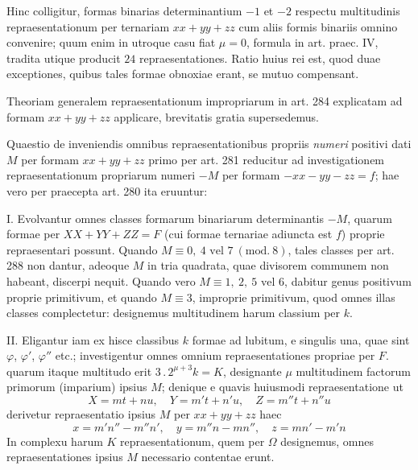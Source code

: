 Hinc colligitur, formas binarias determinantium $-1$ et $-2$ respectu multitudinis repraesentationum per ternariam $xx+yy+zz$ cum aliis formis binariis omnino convenire; quum enim in utroque casu fiat $\mu=0$, formula in art. praec. IV, tradita utique producit $24$ repraesentationes. Ratio huius rei est, quod duae exceptiones, quibus tales formae obnoxiae erant, se mutuo compensant.

Theoriam generalem repraesentationum impropriarum in art. 284 explicatam ad formam $xx+yy+zz$ applicare, brevitatis gratia supersedemus.

Quaestio de inveniendis omnibus repraesentationibus propriis \textit{numeri} positivi dati $M$ per formam $xx+yy+zz$ primo per art. 281 reducitur ad investigationem repraesentationum propriarum numeri $-M$ per formam $-xx-yy-zz=f$; hae vero per praecepta art. 280 ita eruuntur:

I. Evolvantur omnes classes formarum binariarum determinantis $-M$, quarum formae per $XX+YY+ZZ=F$ (cui formae ternariae adiuncta est $f$) proprie repraesentari possunt. Quando $M\equiv0,\allowbreak \ 4\text{ vel }7\ (\mathrm{mod.}\ 8)$, tales classes per art. 288 non dantur, adeoque $M$ in tria quadrata, quae divisorem communem non habeant, discerpi nequit. Quando vero $M\equiv1,\ 2,\ 5\text{ vel }6$, dabitur genus positivum proprie primitivum, et quando $M\equiv3$, improprie primitivum, quod omnes illas classes complectetur: designemus multitudinem harum classium per $k$.

II. Eligantur iam ex hisce classibus $k$ formae ad lubitum, e singulis una, quae sint $\varphi$, $\varphi'$, $\varphi''$ etc.; investigentur omnes omnium repraesentationes propriae per $F$. quarum itaque multitudo erit $3\, .\, 2^{\mu+3}k=K$, designante $\mu$ multitudinem factorum primorum (imparium) ipsius $M$; denique e quavis huiusmodi repraesentatione ut
\[
X=mt+nu,\quad Y=m't+n'u,\quad Z=m''t+n''u
\]
derivetur repraesentatio ipsius $M$ per $xx+yy+zz$ haec
\[
x=m'n''-m''n',\quad y=m''n-mn'',\quad z=mn'-m'n
\]
In complexu harum $K$ repraesentationum, quem per $\Omega$ designemus, omnes repraesentationes ipsius $M$ necessario contentae erunt.

